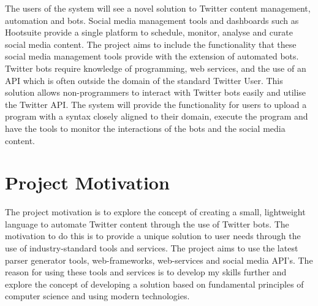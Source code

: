 The users of the system will see a novel solution to Twitter content management, automation and bots. Social media management tools and dashboards such as Hootsuite provide a single platform to schedule, monitor, analyse and curate social media content. The project aims to include the functionality that these social media management tools provide with the extension of automated bots. Twitter bots require knowledge of programming, web services, and the use of an API which is often outside the domain of the standard Twitter User. This solution allows non-programmers to interact with Twitter bots easily and utilise the Twitter API. The system will provide the functionality for users to upload a program with a syntax closely aligned to their domain, execute the program and have the tools to monitor the interactions of the bots and the social media content.

\section{Project Motivation}

The project motivation is to explore the concept of creating a small, lightweight language to automate Twitter content through the use of Twitter bots. The motivation to do this is to provide a unique solution to user needs through the use of industry-standard tools and services. The project aims to use the latest parser generator tools, web-frameworks, web-services and social media API's. The reason for using these tools and services is to develop my skills further and explore the concept of developing a solution based on fundamental principles of computer science and using modern technologies.

